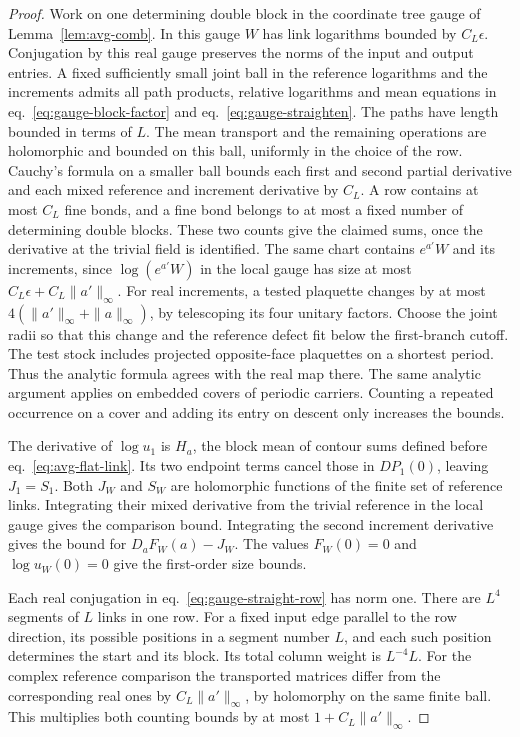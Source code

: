 \documentclass[11pt,letterpaper,reqno]{amsart}
\numberwithin{equation}{section}
\renewcommand{\eqref}[1]{\textup{eq.~\ref{#1}}}
\theoremstyle{definition}
\theoremstyle{remark}
\begin{document}
\begin{proof}
Work on one determining double block in the coordinate tree gauge of
Lemma~\ref{lem:avg-comb}. In this gauge \(W\) has link logarithms
bounded by \(C_L\epsilon\). Conjugation by this real gauge preserves the
norms of the input and output entries. A fixed sufficiently small
joint ball in the reference logarithms and the increments admits all
path products, relative logarithms and mean equations in
\eqref{eq:gauge-block-factor} and \eqref{eq:gauge-straighten}.
The paths have length bounded in terms of \(L\). The mean transport and
the remaining operations are holomorphic and bounded on this ball,
uniformly in the choice of the row. Cauchy's formula on a smaller ball
bounds each first and second partial derivative and each mixed
reference and increment derivative by \(C_L\). A row contains at most
\(C_L\) fine bonds, and a fine bond belongs to at most a fixed number
of determining double blocks. These two counts give the claimed
sums, once the derivative at the trivial field is identified.
The same chart contains \(e^{a'}W\) and its increments, since
\(\log(e^{a'}W)\) in the local gauge has size at most
\(C_L\epsilon+C_L\|a'\|_\infty\).
For real increments, a tested plaquette changes by at most
\(4(\|a'\|_\infty+\|a\|_\infty)\), by telescoping its four
unitary factors. Choose the joint radii so that this change and
the reference defect fit below the first-branch cutoff. The test
stock includes projected opposite-face plaquettes on a shortest
period. Thus the analytic formula agrees with the real map there.
The same analytic argument applies on embedded covers of periodic carriers. Counting a repeated occurrence
on a cover and adding its entry on descent only increases the bounds.

The derivative of \(\log u_1\) is \(H_a\), the block mean of contour
sums defined before \eqref{eq:avg-flat-link}. Its two endpoint terms cancel
those in \(DP_1(0)\), leaving \(J_1=S_1\).
Both \(J_W\) and \(S_W\) are holomorphic functions of
the finite set of reference links. Integrating their mixed derivative
from the trivial reference in the local gauge gives the comparison
bound. Integrating the second increment derivative gives the bound
for \(D_aF_W(a)-J_W\). The values \(F_W(0)=0\) and
\(\log u_W(0)=0\) give the first-order size bounds.

Each real conjugation in \eqref{eq:gauge-straight-row} has norm one.
There are \(L^4\) segments of \(L\) links in one row. For a fixed input
edge parallel to the row direction, its possible positions in a
segment number \(L\), and each such position determines the start
and its block. Its total column weight is \(L^{-4}L\).
For the complex reference comparison the transported matrices differ
from the corresponding real ones by \(C_L\|a'\|_\infty\), by
holomorphy on the same finite ball. This multiplies both counting
bounds by at most \(1+C_L\|a'\|_\infty\).
\end{proof}
\end{document}
